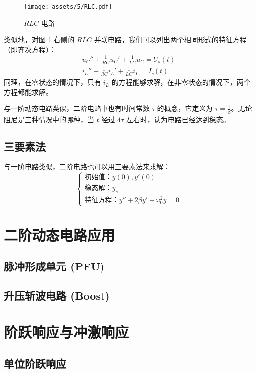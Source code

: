 \documentclass[UTF8]{report}
\theoremstyle{MyLineTheoremStyle} %
\theoremstyle{MyBlockTheoremStyle} %
\theoremstyle{MySubsubsectionStyle} %
\begin{document}
\begin{figure}[H]\centering
    \texttt{[image: assets/5/RLC.pdf]}
    \caption{$RLC$ 电路}\label{RLC}
\end{figure}

类似地，对图 \ref{RLC} 右侧的 $RLC$ 并联电路，我们可以列出两个相同形式的特征方程（即齐次方程）：
\begin{gather}
    u_C'' + \frac{1}{RC} u_C' + \frac{1}{LC} u_C = U_s(t) \\
    i_L'' + \frac{1}{RC} i_L' + \frac{1}{LC} i_L = I_s(t)
\end{gather}
同理，在零状态的情况下，只有 $i_L$ 的方程能够求解，在非零状态的情况下，两个方程都能求解。

与一阶动态电路类似，二阶电路中也有时间常数 $\tau$ 的概念，它定义为 $\tau = \frac{1}{\beta}$。无论阻尼是三种情况中的哪种，当 $t$ 经过 $4\tau$ 左右时，认为电路已经达到稳态。



\subsection{三要素法}
与一阶电路类似，二阶电路也可以用三要素法来求解：
\begin{equation}
\begin{cases}
    \text{初始值：} y(0), y'(0) \\
    \text{稳态解：} y_s \\
    \text{特征方程：} y'' + 2\beta y' + \omega_0^2 y = 0
\end{cases}
\end{equation}

\section{二阶动态电路应用}
\subsection{脉冲形成单元 (PFU)}
\subsection{升压斩波电路 (Boost)}

\section{阶跃响应与冲激响应}

\subsection{单位阶跃响应}
\end{document}
